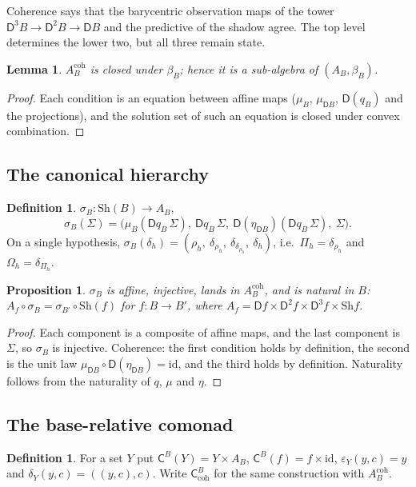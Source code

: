 \documentclass[11pt]{article}
\newtheorem{proposition}[theorem]{Proposition}
\newtheorem{lemma}[theorem]{Lemma}
\theoremstyle{definition}
\newtheorem{definition}[theorem]{Definition}
\theoremstyle{remark}
\newcommand{\D}{\mathsf{D}}
\newcommand{\Sh}{\mathrm{Sh}}
\newcommand{\C}{\mathsf{C}}
\newcommand{\id}{\mathrm{id}}
\begin{document}
Coherence says that the barycentric observation maps of the tower $\D^3B\to\D^2B\to\D B$ and the
predictive of the shadow agree. The top level determines the lower two, but all three remain state.

\begin{lemma}\label{lem:coh-closed}
$A_B^{\mathrm{coh}}$ is closed under $\beta_B$; hence it is a sub-algebra of $(A_B,\beta_B)$.
\end{lemma}
\begin{proof}
Each condition is an equation between affine maps ($\mu_B$, $\mu_{\D B}$, $\D(q_B)$ and the
projections), and the solution set of such an equation is closed under convex combination.
\end{proof}

\subsection{The canonical hierarchy}

\begin{definition}
$\sigma_B\colon\Sh(B)\to A_B$,
\[
\sigma_B(\Sigma)=\big(\mu_B(\D q_B\,\Sigma),\ \D q_B\,\Sigma,\ \D(\eta_{\D B})(\D q_B\,\Sigma),\ \Sigma\big).
\]
On a single hypothesis, $\sigma_B(\delta_h)=(\rho_h,\ \delta_{\rho_h},\ \delta_{\delta_{\rho_h}},\
\delta_h)$, i.e.\ $\Pi_h=\delta_{\rho_h}$ and $\Omega_h=\delta_{\Pi_h}$.
\end{definition}

\begin{proposition}\label{prop:sigma}
$\sigma_B$ is affine, injective, lands in $A_B^{\mathrm{coh}}$, and is natural in $B$:
$A_f\circ\sigma_B=\sigma_{B'}\circ\Sh(f)$ for $f\colon B\to B'$, where
$A_f=\D f\times\D^2f\times\D^3f\times\Sh f$.
\end{proposition}
\begin{proof}
Each component is a composite of affine maps, and the last component is $\Sigma$, so $\sigma_B$ is
injective. Coherence: the first condition holds by definition, the second is the unit law
$\mu_{\D B}\circ\D(\eta_{\D B})=\id$, and the third holds by definition. Naturality follows from the
naturality of $q$, $\mu$ and $\eta$.
\end{proof}

\subsection{The base-relative comonad}

\begin{definition}
For a set $Y$ put $\C^B(Y)=Y\times A_B$, $\C^B(f)=f\times\id$,
$\varepsilon_Y(y,c)=y$ and $\delta_Y(y,c)=((y,c),c)$. Write $\C^B_{\mathrm{coh}}$ for the same
construction with $A^{\mathrm{coh}}_B$.
\end{definition}
\end{document}
